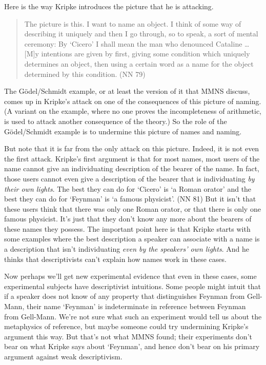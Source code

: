 \documentclass[
  11pt,
  letterpaper,
  DIV=11,
  numbers=noendperiod,
  twoside]{scrartcl}
\begin{document}
Here is the way Kripke introduces the picture that he is attacking.

\begin{quote}
The picture is this. I want to name an object. I think of some way of
describing it uniquely and then I go through, so to speak, a sort of
mental ceremony: By `Cicero' I shall mean the man who denounced Cataline
\ldots{} {[}M{]}y intentions are given by first, giving some condition
which uniquely determines an object, then using a certain word as a name
for the object determined by this condition. (NN 79)
\end{quote}

The Gödel/Schmidt example, or at least the version of it that MMNS
discuss, comes up in Kripke's attack on one of the consequences of this
picture of naming. (A variant on the example, where no one proves the
incompleteness of arithmetic, is used to attack another consequence of
the theory.) So the role of the Gödel/Schmidt example is to undermine
this picture of names and naming.

But note that it is far from the only attack on this picture. Indeed, it
is not even the first attack. Kripke's first argument is that for most
names, most users of the name cannot give an individuating description
of the bearer of the name. In fact, those users cannot even give a
description of the bearer that is individuating \emph{by their own
lights}. The best they can do for `Cicero' is `a Roman orator' and the
best they can do for `Feynman' is `a famous physicist'. (NN 81) But it
isn't that these users think that there was only one Roman orator, or
that there is only one famous physicist. It's just that they don't know
any more about the bearers of these names they possess. The important
point here is that Kripke starts with some examples where the best
description a speaker can associate with a name is a description that
isn't individuating \emph{even by the speakers' own lights}. And he
thinks that descriptivists can't explain how names work in these cases.

Now perhaps we'll get new experimental evidence that even in these
cases, some experimental subjects have descriptivist intuitions. Some
people might intuit that if a speaker does not know of any property that
distinguishes Feynman from Gell-Mann, their name `Feynman' is
indeterminate in reference between Feynman from Gell-Mann. We're not
sure what such an experiment would tell us about the metaphysics of
reference, but maybe someone could try undermining Kripke's argument
this way. But that's not what MMNS found; their experiments don't bear
on what Kripke says about `Feynman', and hence don't bear on his primary
argument against weak descriptivism.
\end{document}
